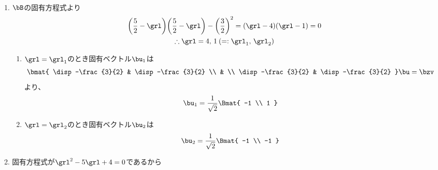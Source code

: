 \begin{ans*}
  ${}$
  \begin{enumerate}[label=(\arabic*)]
    \item $\bB$の固有方程式より
    \begin{gather}
      \biggl(\frac{5}{2}-\grl\biggr)\biggl(\frac{5}{2}-\grl\biggr)-\biggl(\frac{3}{2}\biggr)^2
      = (\grl - 4)(\grl - 1) = 0 \\
      \therefore \grl = 4,\, 1\:(=:\grl_1,\,\grl_2)
    \end{gather}
    \begin{enumerate}[label=(\roman*)]
      \item $\grl=\grl_1$のとき固有ベクトル$\bu_1$は
      \begin{gather}
        \bmat{
          \disp -\frac{3}{2} & \disp -\frac{3}{2} \\
          & \\
          \disp -\frac{3}{2} & \disp -\frac{3}{2}
        }\bu = \bzv
      \end{gather}
      より、
      \begin{gather}
        \bu_1 = \frac{1}{\sqrt{2}}\Bmat{
          -1 \\ 1
        }
      \end{gather}
      \item $\grl=\grl_2$のとき固有ベクトル$\bu_2$は
      \begin{gather}
        \bu_2 = \frac{1}{\sqrt{2}}\Bmat{
          -1 \\ -1
        }
      \end{gather}
    \end{enumerate}
    \item 固有方程式が$\grl^2-5\grl + 4=0$であるから

\end{enumerate}
\end{ans*}
